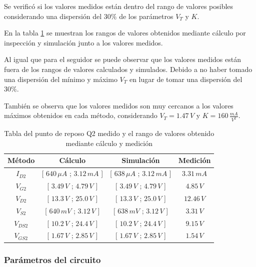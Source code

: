 \documentclass[10pt,spanish,a4paper,notitlepage]{article}
\begin{document}
Se verificó si los valores medidos están dentro del rango de valores
posibles considerando una dispersión del $30\%$ de los parámetros $V_T$ y $K$.

En la tabla \ref{table:B_Q2_rango} se muestran los rangos de valores obtenidos
mediante cálculo por inspección y simulación junto a los valores medidos.

Al igual que para el seguidor se puede observar que los valores medidos están fuera de los rangos
de valores calculados y simulados. Debido a no haber tomado una dispersión del mínimo y máximo
$V_T$ en lugar de tomar una dispersión del $30\%$.

También se observa que los valores medidos son muy cercanos
a los valores máximos obtenidos en cada método, considerando $V_T = 1.47\,\unit{V}$ y 
$K = 160\,\unit{\frac{mA}{V^2}}$.


\begin{table}[H]
\centering
\begin{tabular}{|c|c|c||c|} %
\hline
Método & Cálculo &  Simulación & Medición 
\\ \hline
$I_{D2}$ & [ $640\,\unit{\mu A}$ ; $3.12\,\unit{mA}$ ]  &  [ $638\,\unit{\mu A}$ ; $3.12\,\unit{mA}$ ] & $3.31\,\unit{mA}$
\\ \hline
$V_{G2}$ & [ $3.49\,\unit{V}$ ; $4.79\,\unit{V}$ ] & [ $3.49\,\unit{V}$ ; $4.79\,\unit{V}$ ] & $4.85\,\unit{V}$ 
\\ \hline
$V_{D2}$ & [ $13.3\,\unit{V}$ ; $25.0\,\unit{V}$ ] & [ $13.3\,\unit{V}$ ; $25.0\,\unit{V}$ ] & $12.46\,\unit{V}$  
\\ \hline
$V_{S2}$ & [ $640\,\unit{mV}$ ; $3.12\,\unit{V}$ ] & [ $638\,\unit{mV}$ ; $3.12\,\unit{V}$ ] & $3.31\,\unit{V}$  
\\ \hline
$V_{DS2}$ & [ $10.2\,\unit{V}$ ; $24.4\,\unit{V}$ ] & [ $10.2\,\unit{V}$ ; $24.4\,\unit{V}$ ] & $9.15\,\unit{V}$  
\\ \hline
$V_{GS2}$ & [ $1.67\,\unit{V}$ ; $2.85\,\unit{V}$ ] & [ $1.67\,\unit{V}$ ; $2.85\,\unit{V}$ ] & $1.54\,\unit{V}$  
\\ \hline
\end{tabular}
\caption{Tabla del punto de reposo Q2 medido y el rango de valores obtenido mediante cálculo y medición}
\label{table:B_Q2_rango}
\end{table}


\subsubsection{Parámetros del circuito}
\end{document}
